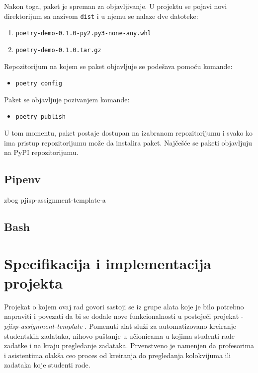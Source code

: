 \documentclass[12pt]{report}
\begin{document}
Nakon toga, paket je spreman za objavljivanje. U projektu se pojavi novi direktorijum sa nazivom \texttt{dist} i u njemu se nalaze dve datoteke:

\begin{enumerate}
    \item \texttt{poetry-demo-0.1.0-py2.py3-none-any.whl}
    \item \texttt{poetry-demo-0.1.0.tar.gz}
\end{enumerate}

Repozitorijum na kojem se paket objavljuje se podešava pomoću komande:

\begin{itemize}
    \item \texttt{poetry config}
\end{itemize}

Paket se objavljuje pozivanjem komande:

\begin{itemize}
    \item \texttt{poetry publish}
\end{itemize}

U tom momentu, paket postaje dostupan na izabranom repozitorijumu i svako ko ima pristup repozitorijumu može da instalira paket. Najčešće se paketi objavljuju na PyPI repozitorijumu.

\section{Pipenv}
zbog pjisp-assignment-template-a

\section{Bash}

\chapter{Specifikacija i implementacija projekta}

Projekat o kojem ovaj rad govori sastoji se iz grupe alata koje je bilo potrebno napraviti i povezati da bi se dodale nove funkcionalnosti u postojeći projekat - \textit{pjisp-assignment-template} \cite{pjisp-assignment-template}. Pomenuti alat služi za automatizovano kreiranje studentskih zadataka, nihovo puštanje u učionicama u kojima studenti rade zadatke i na kraju pregledanje zadataka. Prvenstveno je namenjen da profesorima i asistentima olakša ceo proces od kreiranja do pregledanja kolokvijuma ili zadataka koje studenti rade.
\end{document}
